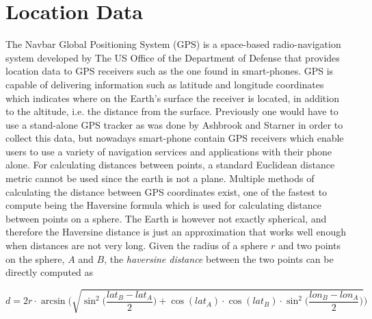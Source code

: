 \section{Location Data}
The Navbar Global Positioning System (GPS) is a space-based radio-navigation system developed by The US Office of the Department of Defense \cite{gps-navstar} that provides location data to GPS receivers such as the one found in smart-phones. GPS is capable of delivering information such as latitude and longitude coordinates which indicates where on the Earth's surface the receiver is located, in addition to the altitude, i.e. the distance from the surface. Previously one would have to use a stand-alone GPS tracker as was done by Ashbrook and Starner \cite{using_gps_to_learn_significant_locations} in order to collect this data, but nowadays smart-phone contain GPS receivers which enable users to use a variety of navigation services and applications with their phone alone. For calculating distances between points, a standard Euclidean distance metric cannot be used since the earth is not a plane. Multiple methods of calculating the distance between GPS coordinates exist, one of the fastest to compute being the Haversine formula \cite{haversine-formula} which is used for calculating distance between points on a sphere. The Earth is however not exactly spherical, and therefore the Haversine distance is just an approximation that works well enough when distances are not very long. Given the radius of a sphere $r$ and two points on the sphere, $A$ and $B$, the \textit{haversine distance} between the two points can be directly computed as 

\begin{equation}
\label{eq:haversine}
d = 2r \cdot \arcsin \Bigg( \sqrt{\sin^2 \bigg( \frac{lat_B - lat_A}{2} \bigg) + \cos(lat_A) \cdot \cos(lat_B) \cdot \sin^2 \bigg(\frac{ lon_B - lon_A}{2} \bigg)}\Bigg)
\end{equation}

